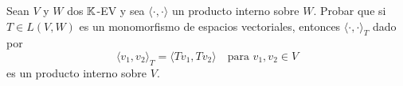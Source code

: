 \item Sean $V$ y $W$ dos $\mathbb{K}$-EV y sea $\langle\cdot,\cdot\rangle$ un producto interno sobre $W$. Probar que si $T\in L(V,W)$ es un monomorfismo de espacios vectoriales, entonces $\langle\cdot,\cdot\rangle_T$ dado por\[\langle v_1,v_2\rangle_T=\langle Tv_1,Tv_2\rangle\quad\text{para }v_1,v_2\in V\]
    es un producto interno sobre $V$.
    \begin{mdframed}[style=s]
        
    \end{mdframed}